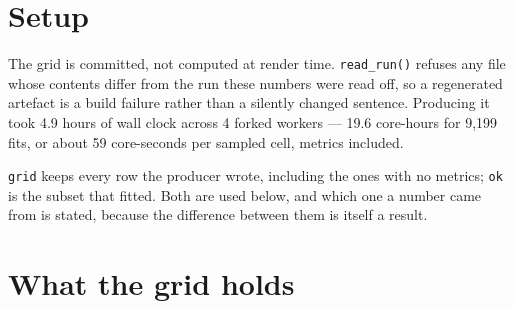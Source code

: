 \documentclass[
  british,
  a4paper,
]{book}
\newenvironment{Shaded}{\begin{snugshade}}{\end{snugshade}}
\newcommand{\FunctionTok}[1]{\textcolor[rgb]{0.13,0.29,0.53}{\textbf{#1}}}
\newcommand{\NormalTok}[1]{#1}
\newcommand{\OtherTok}[1]{\textcolor[rgb]{0.56,0.35,0.01}{#1}}
\newcommand{\SpecialCharTok}[1]{\textcolor[rgb]{0.81,0.36,0.00}{\textbf{#1}}}
\newcommand{\StringTok}[1]{\textcolor[rgb]{0.31,0.60,0.02}{#1}}
\begin{document}
\section{Setup}\label{results-setup}

\begin{Shaded}
\end{Shaded}

The grid is committed, not computed at render time. \texttt{read\_run()} refuses any
file whose contents differ from the run these numbers were read off, so a
regenerated artefact is a build failure rather than a silently changed sentence.
Producing it took 4.9 hours of wall clock across
4 forked workers --- 19.6
core-hours for 9,199 fits, or about
59
core-seconds per sampled cell, metrics included.

\texttt{grid} keeps every row the producer wrote, including the ones with no metrics;
\texttt{ok} is the subset that fitted. Both are used below, and which one a number came
from is stated, because the difference between them is itself a result.

\section{What the grid holds}\label{results-background}
\end{document}

